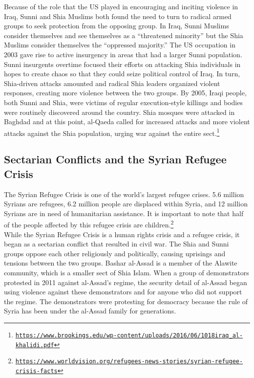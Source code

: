 \documentclass[10pt, letterpaper]{article}
\begin{document}
Because of the role that the US played in encouraging and inciting
violence in Iraq, Sunni and Shia Muslims both found the need to turn to
radical armed groups to seek protection from the opposing group. In
Iraq, Sunni Muslims consider themselves and see themselves as a
``threatened minority'' but the Shia Muslims consider themselves the
``oppressed majority.'' The US occupation in 2003 gave rise to active
insurgency in areas that had a larger Sunni population. Sunni insurgents
overtime focused their efforts on attacking Shia individuals in hopes to
create chaos so that they could seize political control of Iraq. In
turn, Shia-driven attacks amounted and radical Shia leaders organized
violent responses, creating more violence between the two groups. By
2005, Iraqi people, both Sunni and Shia, were victims of regular
execution-style killings and bodies were routinely discovered around the
country. Shia mosques were attacked in Baghdad and at this point,
al-Qaeda called for increased attacks and more violent attacks against
the Shia population, urging war against the entire sect.\footnote{\texttt{\href{https://www.brookings.edu/wp-content/uploads/2016/06/1018iraq_al-khalidi.pdf}{{https://www.brookings.edu/wp-content/uploads/2016/06/1018iraq\_al-khalidi.pdf}}}} \\

\subsection{Sectarian Conflicts and the Syrian Refugee Crisis}

The Syrian Refugee Crisis is one of the world's largest refugee crises.
5.6 million Syrians are refugees, 6.2 million people are displaced
within Syria, and 12 million Syrians are in need of humanitarian
assistance. It is important to note that half of the people affected by
this refugee crisis are children.\footnote{\texttt{\href{https://www.worldvision.org/refugees-news-stories/syrian-refugee-crisis-facts}{{https://www.worldvision.org/refugees-news-stories/syrian-refugee-crisis-facts}}}} \\

While the Syrian Refugee Crisis is a human rights crisis and a refugee
crisis, it began as a sectarian conflict that resulted in civil war. The
Shia and Sunni groups oppose each other religiously and politically,
causing uprisings and tensions between the two groups. Bashar al-Assad
is a member of the Alawite community, which is a smaller sect of Shia
Islam. When a group of demonstrators protested in 2011 against
al-Assad's regime, the security detail of al-Assad began using violence
against these demonstrators and for anyone who did not support the
regime. The demonstrators were protesting for democracy because the rule
of Syria has been under the al-Assad family for generations. \\
\end{document}
